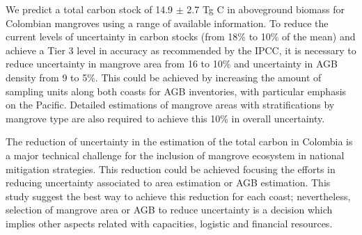 \documentclass[review, authoryear]{elsarticle}   	%
\begin{document}
We predict a total carbon stock of 14.9 $\pm$ 2.7 Tg C in aboveground biomass for Colombian mangroves using a range of available information. 
To reduce the current levels of uncertainty in carbon stocks (from 18\% to 10\% of the mean) and achieve a Tier 3 level in accuracy as recommended by the IPCC, it is necessary to reduce uncertainty in mangrove area from 16 to 10\% and uncertainty in AGB density from 9 to 5\%. This could be achieved by increasing the amount of sampling units along both coasts for AGB inventories, with particular emphasis on the Pacific. Detailed estimations of mangrove areas with stratifications by mangrove type are also required to achieve this 10\% in overall uncertainty. 

The reduction of uncertainty in the estimation of the total carbon in Colombia is a major technical challenge for the inclusion of mangrove ecosystem in national mitigation strategies. This reduction could be achieved focusing the efforts in reducing uncertainty associated to area estimation or AGB estimation. This study suggest the best way to achieve this reduction for each coast; nevertheless, selection of mangrove area or AGB to reduce uncertainty is a decision which implies other aspects related with capacities, logistic and financial resources.

%
%
\end{document}
